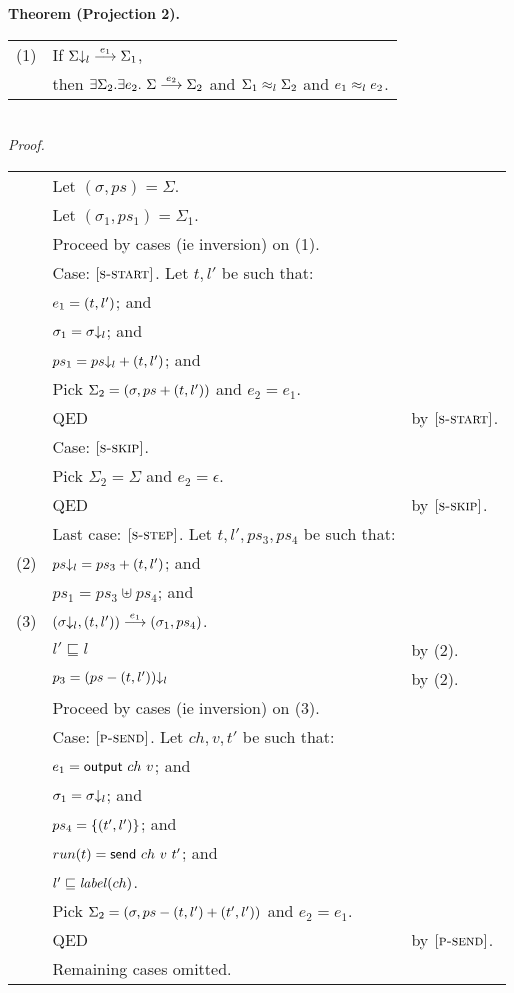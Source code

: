\newpage
\noindent
%
%
\textbf{Theorem (Projection 2).}
\\
\begin{tabular}{l@{$\qquad$}l}
  (1) & If $\sstep{e_1}{\proj{\Sigma}{l}}{\Sigma_1}$,
\\
      & then $\exists \Sigma_2.\exists e_2.~\sstep{e_2}{\Sigma}{\Sigma_2}$
        and $\lequiv{l}{\Sigma_1}{\Sigma_2}$
        and $\lequiv{l}{e_1}{e_2}$.
\end{tabular}
\\
\textit{Proof.}
\\
\begin{tabular}{l@{$\qquad$}l@{\qquad}l}
        & Let $(\sigma,ps)=\Sigma$.
\\
        & Let $(\sigma_1,ps_1)=\Sigma_1$.
\\
        & Proceed by cases (ie inversion) on (1).
\\
        & Case: $\rn{s-start}$. Let $t,l'$ be such that:
\\
        & \z $e_1=\process{t}{l'}$; and
\\
        & \z $\sigma_1=\proj{\sigma}{l}$; and
\\
        & \z $ps_1=\proj{ps}{l}+\process{t}{l'}$; and
\\
        & \z Pick $\Sigma_2 = (\sigma,ps+\process{t}{l'})$ and $e_2=e_1$.
\\
        & \z QED
        & by $\rn{s-start}$.
\\
        & Case: $\rn{s-skip}$.
\\
        & \z Pick $\Sigma_2=\Sigma$ and $e_2=\epsilon$.
\\
        & \z QED
        & by $\rn{s-skip}$.
\\
        & Last case: $\rn{s-step}$. Let $t,l',ps_3,ps_4$ be such that:
\\
  (2)   & $\proj{ps}{l}=ps_3+\process{t}{l'}$; and
\\
        & $ps_1=ps_3\uplus ps_4$; and
\\
  (3)   & $\tstep{e_1}{(\proj{\sigma}{l},\process{t}{l'})}{(\sigma_1,ps_4)}$.
\\
        & $l'\sqsubseteq l$
        & by (2).
\\
        & $p_3 = \proj{(ps-\process{t}{l'})}{l}$
        & by (2).
\\
        & Proceed by cases (ie inversion) on (3).
\\
        & Case: $\rn{p-send}$. Let $ch,v,t'$ be such that:
\\
        & \z $e_1=\evsend{ch}{v}$; and
\\
        & \z $\sigma_1=\proj{\sigma}{l}$; and
\\
        & \z $ps_4=\{\process{t'}{l'}\}$; and
\\
        & \z $run(t)=\opsend{ch}{v}{t'}$; and
\\
        & \z $l'\sqsubseteq\s{label}(ch)$.
\\
        & \z Pick $\Sigma_2 = (\sigma, ps-\process{t}{l'}+\process{t'}{l'})$ and $e_2=e_1$.
\\
        & \z QED
        & by $\rn{p-send}$.
\\
        & Remaining cases omitted.
\end{tabular}

